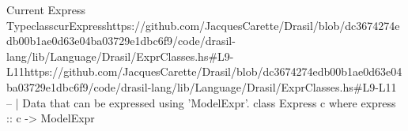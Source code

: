 \begin{haskell}{Current Express Typeclass}{curExpress}{https://github.com/JacquesCarette/Drasil/blob/dc3674274edb00b1ae0d63e04ba03729e1db\newline{}c6f9/code/drasil-lang/lib/Language/Drasil/ExprClasses.hs\#L9-L11}{https://github.com/JacquesCarette/Drasil/blob/dc3674274edb00b1ae0d63e04ba03729e1dbc6f9/code/drasil-lang/lib/Language/Drasil/ExprClasses.hs\#L9-L11}
-- | Data that can be expressed using 'ModelExpr'.
class Express c where
  express :: c -> ModelExpr
\end{haskell}
